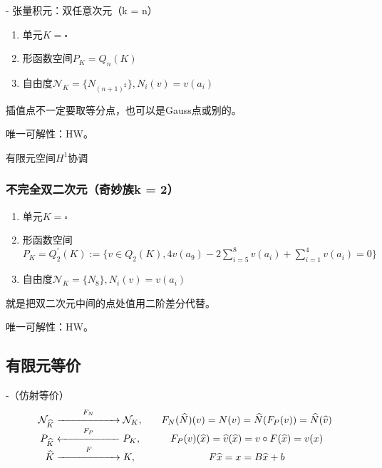 - 张量积元：双任意次元（k = n）

\begin{enumerate}
  \item 单元$K = \square$
  \item 形函数空间$P_K = Q_n(K)$
  \item 自由度$\mathcal{N}_K = \{N_{(n + 1)^2}\}, N_i(v) = v(a_i)$
\end{enumerate}

插值点不一定要取等分点，也可以是Gauss点或别的。

唯一可解性：HW。

有限元空间$H^1$协调

\subsubsection{不完全双二次元（奇妙族k = 2）}

\begin{enumerate}
  \item 单元$K = \square$
  \item 形函数空间$P_K = Q_2^{\prime}(K):=\{v \in Q_{2}(K), 4 v\left(a_{9}\right)-2 \sum_{i=5}^{8} v\left(a_{i}\right)+\sum_{i=1}^{4} v\left(a_{i}\right)=0\}$
  \item 自由度$\mathcal{N}_K = \{N_{8}\}, N_i(v) = v(a_i)$
\end{enumerate}

就是把双二次元中间的点处值用二阶差分代替。

唯一可解性：HW。

\subsection{有限元等价}

-（仿射等价）
\[
  \begin{array}{cc}
    \mathcal{N}_{\widehat{K}} \overset{F_N}{\xrightarrow{\hspace*{2cm}}} \mathcal{N}_K,& \quad F_N(\widehat{N})(v) = N(v) = \widehat{N}(F_P(v)) = \widehat{N}(\widehat{v})\\
    P_{\widehat{K}} \overset{F_P}{\xleftarrow{\hspace*{2cm}}} P_K,& \quad F_P(v)(\widehat{x}) = \widehat{v}(\widehat{x}) = v \circ F(\widehat{x}) = v(x)\\
    \widehat{K} \overset{F}{\xrightarrow{\hspace*{2cm}}} K,& \quad F\widehat{x} = x = B\widehat{x} + b
  \end{array}
\]

